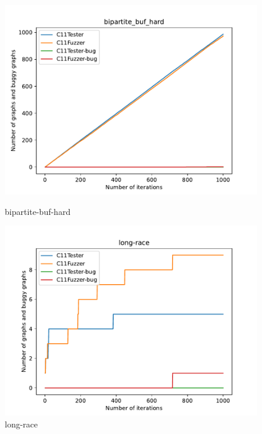 \begin{figure}[H]

	\centering
	\begin{minipage}{0.45\textwidth}
		\centering
		\includegraphics[width=\textwidth]{figure/hardbug/bipartite_buf_hard_bug.pdf}
		\caption{bipartite-buf-hard}
		\label{hardbug:bipartite-buf-hard}
	\end{minipage}
	\hfill
	\begin{minipage}{0.45\textwidth}
		\centering
		\includegraphics[width=\textwidth]{figure/hardbug/long-race_bug.pdf}
		\caption{long-race}
		\label{hardbug:long-race}
	\end{minipage}

	\vspace{0.5cm}


\end{figure}
